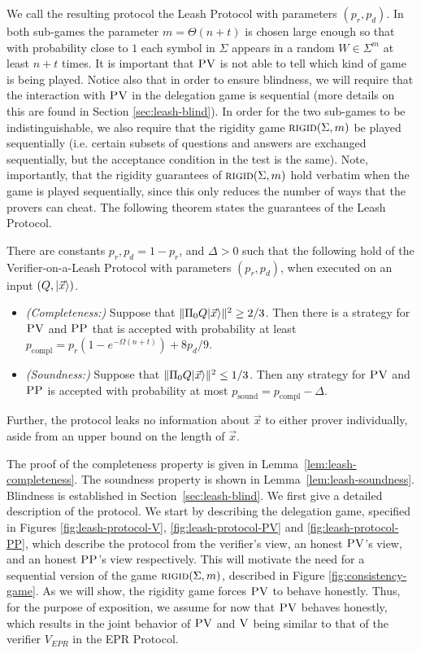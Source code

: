 We call the resulting protocol the Leash Protocol with parameters $(p_r,p_d)$. In both sub-games the parameter $m=\Theta(n+t)$ is chosen large enough so that with probability close to $1$ each symbol in $\Sigma$ appears in a random $W\in \Sigma^m$ at least $n+t$ times. It is important that $\textsc{PV}$ is not able to tell which kind of game is being played. Notice also that in order to ensure blindness, we will require that the interaction with $\textsc{PV}$ in the delegation game is sequential (more details on this are found in Section \ref{sec:leash-blind}). In order for the two sub-games to be indistinguishable, we also require that the rigidity game $\textsc{rigid}(\Sigma,m)$ be played sequentially (i.e. certain subsets of questions and answers are exchanged sequentially, but the acceptance condition in the test is the same). Note, importantly, that the rigidity guarantees of $\textsc{rigid}(\Sigma,m)$ hold verbatim when the game is played sequentially, since this only reduces the number of ways that the provers can cheat. The following theorem states the guarantees of the Leash Protocol.

\begin{theorem}\label{thm:leash}
There are constants $p_r,p_d=1-p_r$, and $\Delta>0$ such that the following hold of the Verifier-on-a-Leash Protocol with parameters $(p_r,p_d)$, when executed on an input $(Q,|\vec{x}\rangle)$.
\begin{itemize}
\item \emph{(Completeness:)} Suppose that $\|\Pi_0 Q|\vec{x}\rangle\|^2 \geq 2/3$. Then there is a strategy for $\textsc{PV}$ and $\textsc{PP}$ that is accepted with probability at least $p_{\mathrm{compl}} = p_r(1-e^{-\Omega(n+t)})+8p_d/9$. 
\item \emph{(Soundness:)} Suppose that $\|\Pi_0 Q|\vec{x}\rangle\|^2 \leq 1/3$. Then any strategy for $\textsc{PV}$ and $\textsc{PP}$ is accepted with probability at most $p_{\mathrm{sound}} = p_{\mathrm{compl}} - \Delta$. 
\end{itemize}
Further, the protocol leaks no information about $\vec{x}$ to either prover individually, aside from an upper bound on the length of $\vec{x}$. 
\end{theorem}



The proof of the completeness property is given in Lemma~\ref{lem:leash-completeness}. The soundness property is shown in Lemma~\ref{lem:leash-soundness}. Blindness is established in Section~\ref{sec:leash-blind}. 
We first give a detailed description of the protocol. We start by describing the delegation game, specified in Figures \ref{fig:leash-protocol-V}, \ref{fig:leash-protocol-PV} and \ref{fig:leash-protocol-PP}, which describe the protocol from the verifier's view, an honest $\textsc{PV}$'s view, and an honest $\textsc{PP}$'s view respectively. This will motivate the need for a sequential version of the game $\textsc{rigid}(\Sigma,m)$, described in Figure \ref{fig:consistency-game}. As we will show, the rigidity game forces $\textsc{PV}$ to behave honestly. Thus, for the purpose of exposition, we assume for now that $\textsc{PV}$ behaves honestly, which results in the joint behavior of $\textsc{PV}$ and $\textsc{V}$ being similar to that of the verifier $V_{EPR}$ in the EPR Protocol. 

